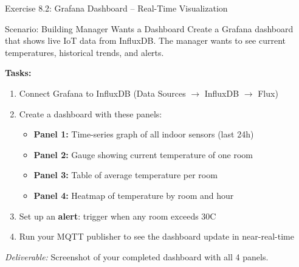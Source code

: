 \documentclass[aspectratio=169,11pt]{beamer}
\begin{document}
\begin{frame}{Exercise 8.2: Grafana Dashboard -- Real-Time Visualization}
    \begin{block}{Scenario: Building Manager Wants a Dashboard}
        Create a Grafana dashboard that shows live IoT data from InfluxDB. The manager wants to see current temperatures, historical trends, and alerts.
    \end{block}

    \vspace{0.2cm}
    \textbf{Tasks:}
    \begin{enumerate}
        \item Connect Grafana to InfluxDB (Data Sources $\rightarrow$ InfluxDB $\rightarrow$ Flux)
        \item Create a dashboard with these panels:
        \begin{itemize}
            \item \textbf{Panel 1:} Time-series graph of all indoor sensors (last 24h)
            \item \textbf{Panel 2:} Gauge showing current temperature of one room
            \item \textbf{Panel 3:} Table of average temperature per room
            \item \textbf{Panel 4:} Heatmap of temperature by room and hour
        \end{itemize}
        \item Set up an \textbf{alert}: trigger when any room exceeds 30\textdegree C
        \item Run your MQTT publisher to see the dashboard update in near-real-time
    \end{enumerate}

    \vspace{0.1cm}
    {\footnotesize \textit{Deliverable:} Screenshot of your completed dashboard with all 4 panels.}
\end{frame}
\end{document}
